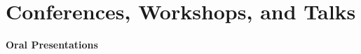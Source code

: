 \documentclass[letterpaper,10.5pt]{article}
\begin{document}


\section{Conferences, Workshops, and Talks}

\medskip
\textbf{Oral Presentations}
\medskip
\end{document}
